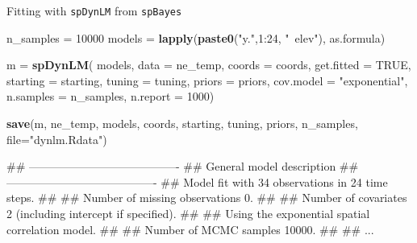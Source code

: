 \documentclass[11pt,ignorenonframetext,]{beamer}
\newenvironment{Shaded}{}{}
\newcommand{\KeywordTok}[1]{\textcolor[rgb]{0.00,0.44,0.13}{\textbf{#1}}}
\newcommand{\DataTypeTok}[1]{\textcolor[rgb]{0.56,0.13,0.00}{#1}}
\newcommand{\DecValTok}[1]{\textcolor[rgb]{0.25,0.63,0.44}{#1}}
\newcommand{\StringTok}[1]{\textcolor[rgb]{0.25,0.44,0.63}{#1}}
\newcommand{\OtherTok}[1]{\textcolor[rgb]{0.00,0.44,0.13}{#1}}
\newcommand{\OperatorTok}[1]{\textcolor[rgb]{0.40,0.40,0.40}{#1}}
\newcommand{\NormalTok}[1]{#1}
\let\oldShaded\Shaded
\let\endoldShaded\endShaded
\renewenvironment{Shaded}{\footnotesize\begin{spacing}{0.9}\oldShaded}{\endoldShaded\end{spacing}}
\let\oldverbatim\verbatim
\let\endoldverbatim\endverbatim
\newcommand{\scriptoutput}{
  \renewenvironment{Shaded}{\scriptsize\begin{spacing}{0.9}\oldShaded}{\endoldShaded\end{spacing}}
  \renewenvironment{verbatim}{\scriptsize\begin{spacing}{0.9}\oldverbatim}{\endoldverbatim\end{spacing}}
}
\begin{document}
\begin{frame}[fragile]{Fitting with \texttt{spDynLM} from
\texttt{spBayes}}

\scriptoutput

\begin{Shaded}
\begin{Highlighting}[]
\NormalTok{n_samples =}\StringTok{ }\DecValTok{10000}
\NormalTok{models =}\StringTok{ }\KeywordTok{lapply}\NormalTok{(}\KeywordTok{paste0}\NormalTok{(}\StringTok{"y."}\NormalTok{,}\DecValTok{1}\OperatorTok{:}\DecValTok{24}\NormalTok{, }\StringTok{"~elev"}\NormalTok{), as.formula)}

\NormalTok{m =}\StringTok{ }\KeywordTok{spDynLM}\NormalTok{(}
\NormalTok{  models, }\DataTypeTok{data =}\NormalTok{ ne_temp, }\DataTypeTok{coords =}\NormalTok{ coords, }\DataTypeTok{get.fitted =} \OtherTok{TRUE}\NormalTok{,}
  \DataTypeTok{starting =}\NormalTok{ starting, }\DataTypeTok{tuning =}\NormalTok{ tuning, }\DataTypeTok{priors =}\NormalTok{ priors,}
  \DataTypeTok{cov.model =} \StringTok{"exponential"}\NormalTok{, }\DataTypeTok{n.samples =}\NormalTok{ n_samples, }\DataTypeTok{n.report =} \DecValTok{1000}\NormalTok{)}

\KeywordTok{save}\NormalTok{(m, ne_temp, models, coords, starting, tuning, priors, n_samples, }
     \DataTypeTok{file=}\StringTok{"dynlm.Rdata"}\NormalTok{)}

\NormalTok{##  ----------------------------------------}
\NormalTok{##      General model description}
\NormalTok{##  ----------------------------------------}
\NormalTok{##  Model fit with 34 observations in 24 time steps.}
\NormalTok{##  }
\NormalTok{##  Number of missing observations 0.}
\NormalTok{##  }
\NormalTok{##  Number of covariates 2 (including intercept if specified).}
\NormalTok{##  }
\NormalTok{##  Using the exponential spatial correlation model.}
\NormalTok{##  }
\NormalTok{##  Number of MCMC samples 10000.}
\NormalTok{##}
\NormalTok{##  ...}
\end{Highlighting}
\end{Shaded}

\end{frame}
\end{document}
